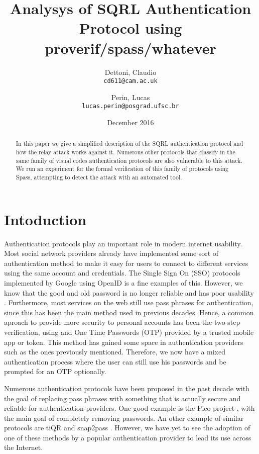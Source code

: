 \documentclass{article}
\title{Analysys of SQRL Authentication Protocol using proverif/spass/whatever}
\author{Dettoni, Claudio\\
	\texttt{cd611@cam.ac.uk}
	\and
	Perin, Lucas\\
	\texttt{lucas.perin@posgrad.ufsc.br}
}
\date{December 2016}
\begin{document}
\maketitle

\begin{abstract}
	In this paper we give a simplified description of the SQRL authentication
	protocol and how the relay attack works against it. Numerous other
	protocols that classify in the same family of visual codes authentication protocols
	are also vulnerable to this attack. We run an experiment for the formal verification of 
	this family of protocols using Spass, attempting to detect the attack with an
	automated tool.
\end{abstract}

\section{Intoduction}
	Authentication protocols play an important role in modern internet
	usability. Most social network providers already have implemented
	some sort of authentication method to make it easy for users to connect
	to different services using the same account and credentials. The Single Sign On 
	(SSO) protocols implemented by Google using OpenID \cite{openid} is a
	fine examples of this. However, we know that the good and 
	old password is no longer reliable and has poor usability \cite{password}.
	Furthermore, most services on the web still use pass phrases for authentication,
	since this has been the main method used in previous decades. Hence,
	a common aproach to provide more security to personal accounts has 
	been the two-step verification, using and One Time Passwords (OTP) 
	provided by a trusted mobile app or token. This	method has gained some 
	space in authentication providers such as the
	ones previously mentioned. Therefore, we now have a mixed authentication process
	where the user can still use his passwords and be prompted for an
	OTP optionally.

	Numerous authentication protocols have been proposed in the past
	decade with the goal of replacing pass phrases with something that
	is actually secure and reliable for authentication providers. One
	good example is the Pico project \cite{pico}, with the main goal of
	completely removing passwords. An other example of similar protocols
	are tiQR \cite{tiqr} and snap2pass \cite{snap2pass}.
	However, we have yet to see the adoption of one of these methods
	by a popular authentication provider to lead its use across the
	Internet. 
\end{document}
